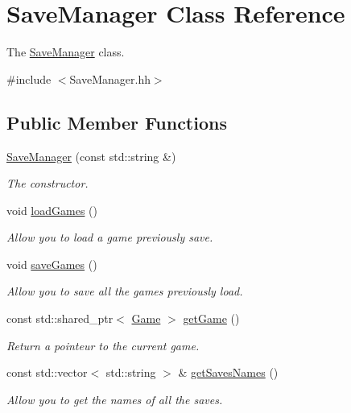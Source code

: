 \hypertarget{classSaveManager}{}\section{Save\+Manager Class Reference}
\label{classSaveManager}


The \hyperlink{classSaveManager}{Save\+Manager} class.  




{\ttfamily \#include $<$Save\+Manager.\+hh$>$}

\subsection*{Public Member Functions}
\begin{DoxyCompactItemize}
\item 
\hyperlink{classSaveManager_a9fe4905980e87fcd68e10471d7cf3cbc}{Save\+Manager} (const std\+::string \&)
\begin{DoxyCompactList}\small\item\em The constructor. \end{DoxyCompactList}\item 
\mbox{\label{classSaveManager_a1ab9679d2cd11cef0b0710fdbbdf9bf7}} 
void \hyperlink{classSaveManager_a1ab9679d2cd11cef0b0710fdbbdf9bf7}{load\+Games} ()
\begin{DoxyCompactList}\small\item\em Allow you to load a game previously save. \end{DoxyCompactList}\item 
\mbox{\label{classSaveManager_a43beb7dd453f37de97c3a8de3b1142ab}} 
void \hyperlink{classSaveManager_a43beb7dd453f37de97c3a8de3b1142ab}{save\+Games} ()
\begin{DoxyCompactList}\small\item\em Allow you to save all the games previously load. \end{DoxyCompactList}\item 
\mbox{\label{classSaveManager_a7b950ce71223640fe56e8d404fe3cd2f}} 
const std\+::shared\+\_\+ptr$<$ \hyperlink{classGame}{Game} $>$ \hyperlink{classSaveManager_a7b950ce71223640fe56e8d404fe3cd2f}{get\+Game} ()
\begin{DoxyCompactList}\small\item\em Return a pointeur to the current game. \end{DoxyCompactList}\item 
const std\+::vector$<$ std\+::string $>$ \& \hyperlink{classSaveManager_aa6efa1546ec4f0d2d0212cbf49f3fb3a}{get\+Saves\+Names} ()
\begin{DoxyCompactList}\small\item\em Allow you to get the names of all the saves. \end{DoxyCompactList}\end{DoxyCompactItemize}


